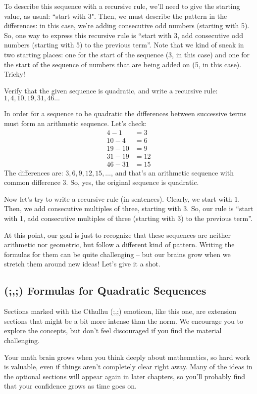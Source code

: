 To describe this sequence with a recursive rule, we'll need to give the starting value, as usual: ``start with 3". Then, we must describe the pattern in the differences: in this case, we're adding consecutive odd numbers (starting with 5). So, one way to express this recursive rule is ``start with 3, add consecutive odd numbers (starting with 5) to the previous term''. Note that we kind of sneak in two starting places: one for the start of the sequence (3, in this case) and one for the start of the sequence of numbers that are being added on (5, in this case). Tricky!

\begin{boxedex}
Verify that the given sequence is quadratic, and write a recursive rule: $1, 4, 10, 19, 31,46\dotsc$

\exsoln{} In order for a sequence to be quadratic the differences between successive terms must form an arithmetic sequence. Let's check:
\[\begin{aligned}
4-1 &= 3\\
10-4 &= 6\\
19-10 &= 9\\
31-19 &= 12\\
46-31 &= 15
\end{aligned}\]
The differences are: $3, 6, 9, 12, 15,\dotsc$, and that's an arithmetic sequence with common difference 3. So, yes, the original sequence is quadratic.

Now let's try to write a recursive rule (in sentences). Clearly, we start with 1. Then, we add consecutive multiples of three, starting with 3. So, our rule is ``start with 1, add consecutive multiples of three (starting with 3) to the previous term''.
\end{boxedex}

At this point, our goal is just to recognize that these sequences are neither arithmetic nor geometric, but follow a different kind of pattern. Writing the formulas for them can be quite challenging -- but our brains grow when we stretch them around new ideas! Let's give it a shot.


\subsection{(;,;) Formulas for Quadratic Sequences}
%
\begin{tcolorbox}[title={Extension Sections}]
Sections marked with the Cthulhu (;,;) emoticon, like this one, are extension sections that might be a bit more intense than the norm. We encourage you to explore the concepts, but don't feel discouraged if you find the material challenging.

Your math brain grows when you think deeply about mathematics, so hard work is valuable, even if things aren't completely clear right away. Many of the ideas in the optional sections will appear again in later chapters, so you'll probably find that your confidence grows as time goes on.
\end{tcolorbox}

